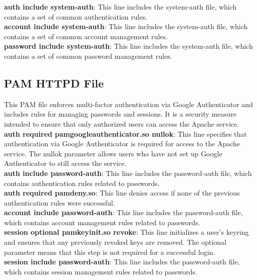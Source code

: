 \documentclass[12pt]{article}
\begin{document}
\textbf{auth include system-auth}: This line includes the system-auth file, which contains a set of common authentication rules.\\

\textbf{account include system-auth}: This line includes the system-auth file, which contains a set of common account management rules.\\

\textbf{password include system-auth}: This line includes the system-auth file, which contains a set of common password management rules.

\newpage 

\subsection{PAM HTTPD File}

This PAM file enforces multi-factor authentication via Google Authenticator and includes rules for managing passwords and sessions. It is a security measure intended to ensure that only authorized users can access the Apache service.\\

\textbf{auth required pam\textunderscore google\textunderscore authenticator.so nullok}: This line specifies that authentication via Google Authenticator is required for access to the Apache service. The nullok parameter allows users who have not set up Google Authenticator to still access the service.\\

\textbf{auth include password-auth}: This line includes the password-auth file, which contains authentication rules related to passwords.\\

\textbf{auth required pam\textunderscore deny.so}: This line denies access if none of the previous authentication rules were successful.\\

\textbf{account include password-auth}: This line includes the password-auth file, which contains account management rules related to passwords.\\

\textbf{session optional pam\textunderscore keyinit.so revoke}: This line initializes a user's keyring and ensures that any previously revoked keys are removed. The optional parameter means that this step is not required for a successful login.\\

\textbf{session include password-auth}: This line includes the password-auth file, which contains session management rules related to passwords.\\
\end{document}
